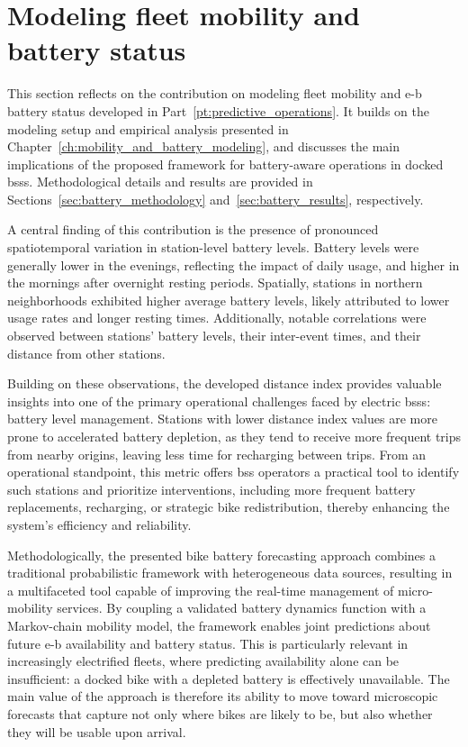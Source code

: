 \section{Modeling fleet mobility and battery status}
\label{sec:disc_battery}

This section reflects on the contribution on modeling fleet mobility and \ac{e-b} battery status developed in Part~\ref{pt:predictive_operations}. It builds on the modeling setup and empirical analysis presented in Chapter~\ref{ch:mobility_and_battery_modeling}, and discusses the main implications of the proposed framework for battery-aware operations in docked \acp{bss}. Methodological details and results are provided in Sections~\ref{sec:battery_methodology} and~\ref{sec:battery_results}, respectively.

A central finding of this contribution is the presence of pronounced spatiotemporal variation in station-level battery levels. Battery levels were generally lower in the evenings, reflecting the impact of daily usage, and higher in the mornings after overnight resting periods. Spatially, stations in northern neighborhoods exhibited higher average battery levels, likely attributed to lower usage rates and longer resting times. Additionally, notable correlations were observed between stations' battery levels, their inter-event times, and their distance from other stations.

Building on these observations, the developed distance index provides valuable insights into one of the primary operational challenges faced by electric \acp{bss}: battery level management. Stations with lower distance index values are more prone to accelerated battery depletion, as they tend to receive more frequent trips from nearby origins, leaving less time for recharging between trips. From an operational standpoint, this metric offers \ac{bss} operators a practical tool to identify such stations and prioritize interventions, including more frequent battery replacements, recharging, or strategic bike redistribution, thereby enhancing the system's efficiency and reliability.

Methodologically, the presented bike battery forecasting approach combines a traditional probabilistic framework with heterogeneous data sources, resulting in a multifaceted tool capable of improving the real-time management of micro-mobility services. By coupling a validated battery dynamics function with a Markov-chain mobility model, the framework enables joint predictions about future \ac{e-b} availability and battery status. This is particularly relevant in increasingly electrified fleets, where predicting availability alone can be insufficient: a docked bike with a depleted battery is effectively unavailable. The main value of the approach is therefore its ability to move toward microscopic forecasts that capture not only where bikes are likely to be, but also whether they will be usable upon arrival.

